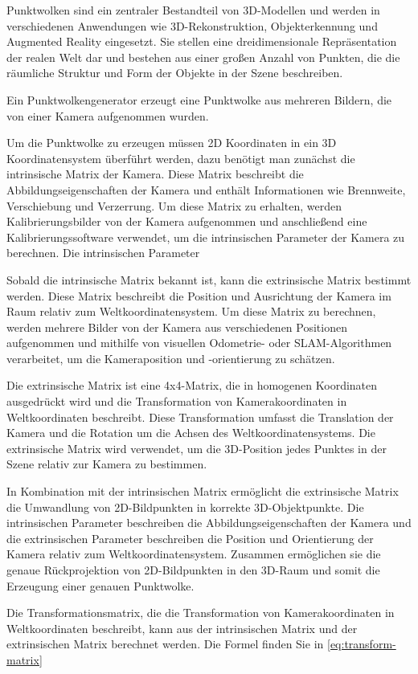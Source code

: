 Punktwolken sind ein zentraler Bestandteil von 3D-Modellen und werden in verschiedenen Anwendungen wie 3D-Rekonstruktion, Objekterkennung und Augmented Reality eingesetzt. Sie stellen eine dreidimensionale Repräsentation der realen Welt dar und bestehen aus einer großen Anzahl von Punkten, die die räumliche Struktur und Form der Objekte in der Szene beschreiben.

Ein Punktwolkengenerator erzeugt eine Punktwolke aus mehreren Bildern, die von einer Kamera aufgenommen wurden.

Um die Punktwolke zu erzeugen müssen 2D Koordinaten in ein 3D Koordinatensystem überführt werden, dazu benötigt man zunächst die intrinsische Matrix der Kamera. Diese Matrix beschreibt die Abbildungseigenschaften der Kamera und enthält Informationen wie Brennweite, Verschiebung und Verzerrung. Um diese Matrix zu erhalten, werden Kalibrierungsbilder von der Kamera aufgenommen und anschließend eine Kalibrierungssoftware verwendet, um die intrinsischen Parameter der Kamera zu berechnen. Die intrinsischen Parameter

Sobald die intrinsische Matrix bekannt ist, kann die extrinsische Matrix bestimmt werden. Diese Matrix beschreibt die Position und Ausrichtung der Kamera im Raum relativ zum Weltkoordinatensystem. Um diese Matrix zu berechnen, werden mehrere Bilder von der Kamera aus verschiedenen Positionen aufgenommen und mithilfe von visuellen Odometrie- oder SLAM-Algorithmen verarbeitet, um die Kameraposition und -orientierung zu schätzen.

Die extrinsische Matrix ist eine 4x4-Matrix, die in homogenen Koordinaten ausgedrückt wird und die Transformation von Kamerakoordinaten in Weltkoordinaten beschreibt. Diese Transformation umfasst die Translation der Kamera und die Rotation um die Achsen des Weltkoordinatensystems. Die extrinsische Matrix wird verwendet, um die 3D-Position jedes Punktes in der Szene relativ zur Kamera zu bestimmen.

In Kombination mit der intrinsischen Matrix ermöglicht die extrinsische Matrix die Umwandlung von 2D-Bildpunkten in korrekte 3D-Objektpunkte. Die intrinsischen Parameter beschreiben die Abbildungseigenschaften der Kamera und die extrinsischen Parameter beschreiben die Position und Orientierung der Kamera relativ zum Weltkoordinatensystem. Zusammen ermöglichen sie die genaue Rückprojektion von 2D-Bildpunkten in den 3D-Raum und somit die Erzeugung einer genauen Punktwolke. 

Die Transformationsmatrix, die die Transformation von Kamerakoordinaten in Weltkoordinaten beschreibt, kann aus der intrinsischen Matrix und der extrinsischen Matrix berechnet werden. Die Formel finden Sie in \ref{eq:transform-matrix}

